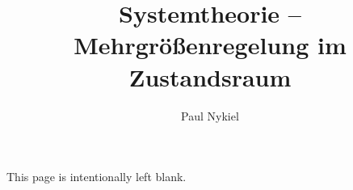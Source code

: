 \documentclass[10pt]{report}
\title{Systemtheorie -- Mehrgrößenregelung im Zustandsraum}
\author{Paul Nykiel}
\begin{document}
    \maketitle
    \pagebreak
    This page is intentionally left blank.
    \pagebreak
    \tableofcontents
    \pagebreak
    
    
    
    
    
    

    \appendix
\end{document}
